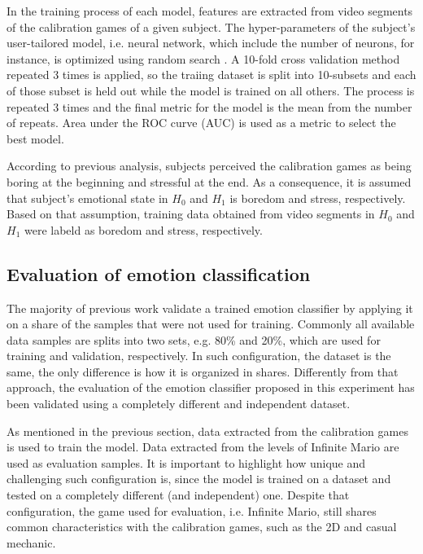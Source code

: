 In the training process of each model, features are extracted from video segments of the calibration games of a given subject. The hyper-parameters of the subject's user-tailored model, i.e. neural network, which include the number of neurons, for instance, is optimized using random search \parencite{bergstra2012random}. A 10-fold cross validation method repeated 3 times is applied, so the traiing dataset is split into 10-subsets and each of those subset is held out while the model is trained on all others. The process is repeated 3 times and the final metric for the model is the mean from the number of repeats. Area under the ROC curve (AUC) is used as a metric to select the best model.

According to previous analysis, subjects perceived the calibration games as being boring at the beginning and stressful at the end. As a consequence, it is assumed that subject's emotional state in $H_0$ and $H_1$ is boredom and stress, respectively. Based on that assumption, training data obtained from video segments in $H_0$ and $H_1$ were labeld as boredom and stress, respectively.

\subsection{Evaluation of emotion classification}

The majority of previous work validate a trained emotion classifier by applying it on a share of the samples that were not used for training. Commonly all available data samples are splits into two sets, e.g. 80\% and 20\%, which are used for training and validation, respectively. In such configuration, the dataset is the same, the only difference is how it is organized in shares. Differently from that approach, the evaluation of the emotion classifier proposed in this experiment has been validated using a completely different and independent dataset.

As mentioned in the previous section, data extracted from the calibration games is used to train the model. Data extracted from the levels of Infinite Mario are used as evaluation samples. It is important to highlight how unique and challenging such configuration is, since the model is trained on a dataset and tested on a completely different (and independent) one. Despite that configuration, the game used for evaluation, i.e. Infinite Mario, still shares common characteristics with the calibration games, such as the 2D and casual mechanic.

